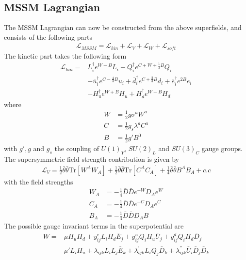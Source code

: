 \subsection{MSSM Lagrangian}
The MSSM Lagrangian can now be constructed from the above superfields, and consists of the following parts
\begin{align}
    \mathcal{L}_{MSSM}=\mathcal{L}_{kin}+\mathcal{L}_{V}+\mathcal{L}_{W}+\mathcal{L}_{soft}
\end{align}
The kinetic part takes the following form
\begin{align}
    \mathcal{L}_{kin}=&L_{i}^{\dagger}e^{W-B}L_{i}+Q_{i}^{\dagger}e^{C+W+\frac{1}{3}B}Q_{i}
    \\
    &+\bar{u}_{i}^{\dagger}e^{C-\frac{4}{3}B}u_{i}+\bar{d}_{i}^{\dagger}e^{C+\frac{2}{3}B}d_{i}+\bar{e}_{i}^{\dagger}e^{2B}e_{i}
    \\
    &+H_{u}^{\dagger}e^{W+B}H_{u}+H_{d}^{\dagger}e^{W-B}H_{d}
\end{align}
where
\begin{align}
    W&=\frac{1}{2}g\sigma^{a}W^{a}
    \\
    C&=\frac{1}{2}g_{s}\lambda^{a}C^{a}
    \\
    B&=\frac{1}{2}g'B^{0}
\end{align}
with $g',g$ and $g_s$ the coupling of $U(1)_{Y}$, $SU(2)_{L}$ and $SU(3)_{C}$ gauge groups. The supersymmetric field strength contribution is given by
\begin{align}
    \mathcal{L}_{V}=\frac{1}{2}\bar{\theta}\bar{\theta}\text{Tr}[W^{A}W_{A}]+\frac{1}{2}\bar{\theta}\bar{\theta}\text{Tr}[C^{A}C_{A}]+\frac{1}{4}\bar{\theta}\bar{\theta}B^{A}B_{A}+c.c
\end{align}
with the field strengths
\begin{align}
    W_{A}&=-\frac{1}{4}\bar{D}\bar{D}e^{-W}D_{A}e^{W}
    \\
    C_{A}&=-\frac{1}{4}\bar{D}\bar{D}e^{-C}D_{A}e^{C}
    \\
    B_{A}&=-\frac{1}{4}\bar{D}\bar{D}D_{A}B
\end{align}
The possible gauge invariant terms in the superpotential are
\begin{align}
    W=&\mu H_{u}H_{d}+y_{ij}^{e}L_{i}H_{d}\bar{E}_{j}+y_{ij}^{u}Q_{i}H_{u}\bar{U}_{j}+y_{ij}^{d}Q_{i}H_{d}\bar{D}_{j}
    \\
    &\mu'L_{i}H_{u}+\lambda_{ijk}L_{i}L_{j}\bar{E}_{k}+\lambda_{ijk}^{'}L_{i}Q_{j}\bar{D}_{k}+\lambda_{ijk}^{''}\bar{U}_{i}\bar{D}_{j}\bar{D}_{k}
\end{align}

